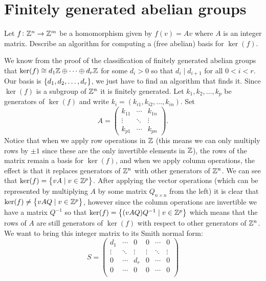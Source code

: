 \documentclass[11pt,a4paper]{article}
\begin{document}
\section{Finitely generated abelian groups}
\begin{exercise}
  Let $f \colon \mathbb{Z}^n \to \mathbb{Z}^m$ be a homomorphism given by
  $f(v) = Av$ where $A$ is an integer matrix.
  Describe an algorithm for computing a (free abelian) basis for $\ker(f)$.
\end{exercise}
\begin{solution}
  We know from the proof of the classification of finitely generated
  abelian groups that $\ker(f) \cong d_1 \mathbb{Z} \oplus \cdots \oplus d_r \mathbb{Z}$
  for some $d_i > 0$ so that $d_i \mid d_{i+1}$ for all $0 < i < r$.
  Our basis is $\left\{d_1,d_2,\dots,d_r\right\}$, we just have to find an algorithm
  that finds it.
  Since $\ker(f)$ is a subgroup of $\mathbb{Z}^n$ it is finitely generated.
  Let $k_1,k_2,\dots,k_p$ be generators of $\ker(f)$ and write
  $k_i = (k_{i1},k_{i2},\dots,k_{in})$.
  Set
  \[
    A =
    \begin{pmatrix}
      k_{11} & \cdots & k_{1n} \\
      \vdots & \ddots & \vdots \\
      k_{p1} & \cdots & k_{pn}
    \end{pmatrix}.
  \]
  Notice that when we apply row operations in $\mathbb{Z}$
  (this means we can only multiply rows by $\pm 1$ since these are the only
  invertible elements in $\mathbb{Z}$),
  the rows of the matrix remain a basis for $\ker(f)$,
  and when we apply column operations, the effect is that
  it replaces generators of $\mathbb{Z}^n$ with other generators of $\mathbb{Z}^n$.
  We can see that $\ker(f) = \left\{vA \mid v \in \mathbb{Z}^p\right\}$.
  After applying the vector operations (which can be represented
  by multiplying $A$ by some matrix $Q_{n \times n}$ from the left)
  it is clear that $\ker(f) \neq \left\{vAQ \mid v \in \mathbb{Z}^p\right\}$,
  however since the column operations are invertible we have a matrix
  $Q^{-1}$ so that $\ker(f) = \left\{(vAQ)Q^{-1} \mid v \in \mathbb{Z}^p\right\}$
  which means that the rows of $A$ are still generators of $\ker(f)$
  with respect to other generators of $\mathbb{Z}^n$.
  We want to bring this integer matrix to its Smith normal form:
  \[
    S =
    \begin{pmatrix}
      d_{1} & \cdots & 0 & 0 & \cdots & 0 \\
      \vdots & \ddots & \vdots & \vdots & \ddots & \vdots \\
      0 & \cdots & d_{r} & 0 & \cdots & 0 \\
      0 & \cdots & 0 & 0 & \cdots & 0 \\

\end{pmatrix}\]
\end{solution}
\end{document}
